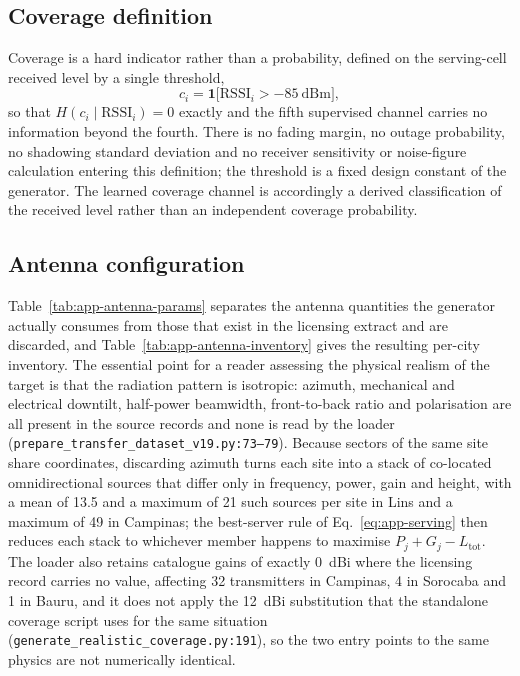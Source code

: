 \subsection{Coverage definition}

Coverage is a hard indicator rather than a probability, defined on the
serving-cell received level by a single threshold,
\begin{equation}
c_{i} = \mathbf{1}\bigl[\mathrm{RSSI}_{i} > -85\ \mathrm{dBm}\bigr] ,
\label{eq:app-coverage}
\end{equation}
so that $H(c_{i}\mid \mathrm{RSSI}_{i}) = 0$ exactly and the fifth
supervised channel carries no information beyond the fourth. There is no
fading margin, no outage probability, no shadowing standard deviation and
no receiver sensitivity or noise-figure calculation entering this
definition; the threshold is a fixed design constant of the generator. The
learned coverage channel is accordingly a derived classification of the
received level rather than an independent coverage probability.

\subsection{Antenna configuration}

Table~\ref{tab:app-antenna-params} separates the antenna quantities the
generator actually consumes from those that exist in the licensing extract
and are discarded, and Table~\ref{tab:app-antenna-inventory} gives the
resulting per-city inventory. The essential point for a reader assessing
the physical realism of the target is that the radiation pattern is
isotropic: azimuth, mechanical and electrical downtilt, half-power
beamwidth, front-to-back ratio and polarisation are all present in the
source records and none is read by the loader
(\texttt{prepare\_\allowbreak{}transfer\_\allowbreak{}dataset\_\allowbreak{}v19.py:\allowbreak{}73--79}). Because sectors of the
same site share coordinates, discarding azimuth turns each site into a
stack of co-located omnidirectional sources that differ only in frequency,
power, gain and height, with a mean of 13.5 and a maximum of 21 such
sources per site in Lins and a maximum of 49 in Campinas; the best-server
rule of Eq.~\eqref{eq:app-serving} then reduces each stack to whichever
member happens to maximise $P_{j}+G_{j}-L_{\mathrm{tot}}$. The loader also
retains catalogue gains of exactly 0~dBi where the licensing record carries
no value, affecting 32 transmitters in Campinas, 4 in Sorocaba and 1 in
Bauru, and it does not apply the 12~dBi substitution that the standalone
coverage script uses for the same situation
(\texttt{generate\_\allowbreak{}realistic\_\allowbreak{}coverage\allowbreak{}.py:\allowbreak{}191}), so the two entry points to
the same physics are not numerically identical.

